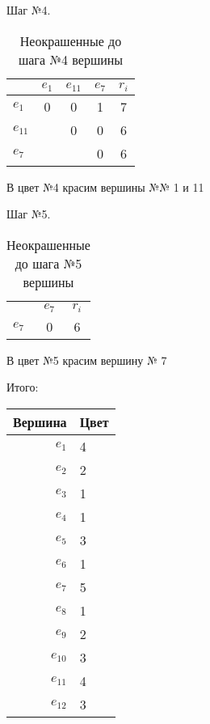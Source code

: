 \documentclass[a4paper,12pt]{article}
\begin{document}
\bigskip
\noindent\begin{minipage}[0cm]{\textwidth}
    Шаг №4.
    \begin{table}[H]
        \raggedright
        \caption{Неокрашенные до шага №4 вершины}
        \begin{tabular}{l|*{3}{c}|c}
                & $e_1$ & $e_{11}$ & $e_7$ & $r_i$ \\ \hline
        $e_{ 1}$ &    0 &       0  &    1  &     7 \\
        $e_{11}$ &      &       0  &    0  &     6 \\
        $e_{ 7}$ &      &          &    0  &     6 \\
        \end{tabular}
    \end{table}
    В цвет №4 красим вершины №№ 1 и 11
\end{minipage}

\bigskip
\noindent\begin{minipage}[0cm]{\textwidth}
    Шаг №5.
    \begin{table}[H]
        \caption{Неокрашенные до шага №5 вершины}
        \begin{tabular}{l|*{1}{c}|c}
        &$e_7$&$r_i$ \\
        $e_7$&0&6 \\
        \end{tabular}
    \end{table}
    В цвет №5 красим вершину № 7
\end{minipage}

\bigskip
\noindent\begin{minipage}[0cm]{\textwidth}
    Итого:
    \begin{table}[H]
        \begin{tabular}{r|l}
            Вершина  & Цвет \\ \hline
            $e_{ 1}$ &    4 \\
            $e_{ 2}$ &    2 \\
            $e_{ 3}$ &    1 \\
            $e_{ 4}$ &    1 \\
            $e_{ 5}$ &    3 \\
            $e_{ 6}$ &    1 \\
            $e_{ 7}$ &    5 \\
            $e_{ 8}$ &    1 \\
            $e_{ 9}$ &    2 \\
            $e_{10}$ &    3 \\
            $e_{11}$ &    4 \\
            $e_{12}$ &    3 \\
        \end{tabular}
    \end{table}
\end{minipage}

\label{LastPage}
\end{document}
